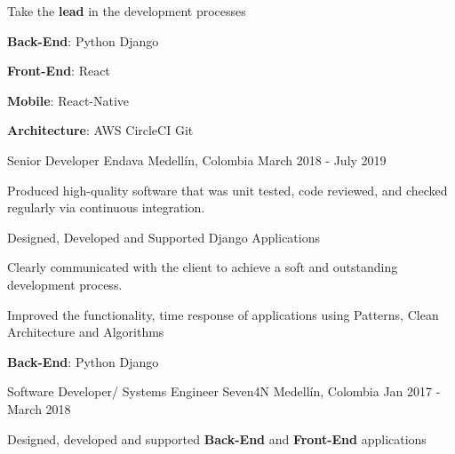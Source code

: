 \begin{cventries}
{\begin{cvitems}
        \item {Take the \textbf{lead} in the development processes}
        \item {\textbf{Back-End}: Python {\dotsep}  {\dotsep} Django {\dotsep} }
        \item {\textbf{Front-End}: React {\dotsep} }
        \item {\textbf{Mobile}: React-Native {\dotsep} }
        \item {\textbf{Architecture}: AWS {\dotsep}  {\dotsep} CircleCI {\dotsep}  {\dotsep} Git {\dotsep} }
      \end{cvitems}
      \begin{cvsubentries}
      \end{cvsubentries}
    }
  \cventry
    {Senior Developer}
    {Endava}
    {Medellín, Colombia}
    {March 2018 - July 2019}
    {
      \begin{cvitems}
        \item {Produced high-quality software that was unit tested, code reviewed, and checked regularly via continuous integration.}
        \item {Designed, Developed and Supported Django Applications}
        \item {Clearly communicated with the client to achieve a soft and outstanding development process.}
        \item {Improved the functionality, time response of applications using Patterns, Clean Architecture and Algorithms}
        \item {\textbf{Back-End}: Python {\dotsep}  {\dotsep} Django {\dotsep} }
      \end{cvitems}
      \begin{cvsubentries}
      \end{cvsubentries}
    }
  \cventry
    {Software Developer/ Systems Engineer}
    {Seven4N}
    {Medellín, Colombia}
    {Jan 2017 - March 2018}
    {
      \begin{cvitems}
        \item {Designed, developed and supported \textbf{Back-End} and \textbf{Front-End} applications}

\end{cvitems}}
\end{cventries}
